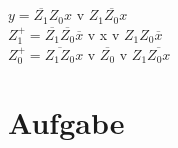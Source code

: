 \documentclass[ngerman,12pt,parskip=half]{scrartcl}
\begin{document}
\vspace{0,5 cm}

\subsection{}
$y=\overline{Z_{1}}Z_{0}x$ v $Z_{1}\overline{Z_{0}}x$ \\
$Z^+_{1}= \overline{Z_{1}}\overline{Z_{0}}\overline{x}$ v x v $Z_{1}Z_0\overline{x}$ \\
$Z^+_{0}=\overline{Z_{1}Z_{0}}x$ v $\overline{Z_{0}}$ v $Z_{1}\overline{Z_{0}x}$

\subsection{}

\begin{center}

\end{center}

\clearpage

\section{Aufgabe} 
\end{document}
